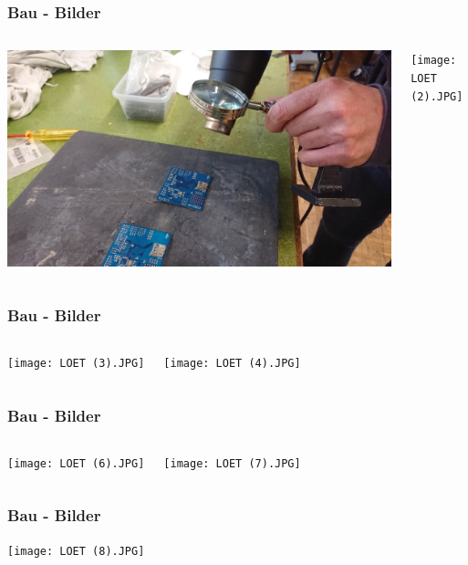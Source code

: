 \documentclass[12pt,a4paper, ngerman]{beamer}
\begin{document}
\begin{frame}
\frametitle{Bau - Bilder}
\begin{columns}
\begin{center}
\includegraphics[width=1\textwidth]{LOET (1).JPG}
\end{center}
\begin{center}
\texttt{[image: LOET (2).JPG]}
\end{center}
\end{columns}
\end{frame}

\begin{frame}
\frametitle{Bau - Bilder}
\begin{columns}
\begin{center}
\texttt{[image: LOET (3).JPG]}
\end{center}
\begin{center}
\texttt{[image: LOET (4).JPG]}
\end{center}
\end{columns}
\end{frame}

\begin{frame}
\frametitle{Bau - Bilder}
\begin{columns}
\begin{center}
\texttt{[image: LOET (6).JPG]}
\end{center}
\begin{center}
\texttt{[image: LOET (7).JPG]}
\end{center}
\end{columns}
\end{frame}

\begin{frame}
\frametitle{Bau - Bilder}
\begin{center}
\texttt{[image: LOET (8).JPG]}
\end{center}
\end{frame}
\end{document}
